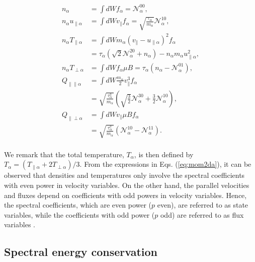 \documentclass[preprint,12pt]{elsarticle}
\begin{document}
\begin{subequations} \label{eq:mom2da}
\begin{align}
 n_\alpha  & = \int d W  f_\alpha  = \mathcal{N}_\alpha^{00}, \\
n_\alpha u_{\parallel \alpha } &  =  \int d W v_{\| } f_\alpha  =  \sqrt{ \frac{ \tau_{\alpha} }{m_\alpha } }   \mathcal{N}_\alpha^{10}, \label{eq:upara} \\
n_\alpha  T_{\parallel \alpha} & =   \int d W   m_\alpha \left(  v_{\|}-u_{\parallel \alpha}  \right)^2 f_\alpha \nonumber \\
& =   \tau_\alpha  \left(  \sqrt{2} \mathcal{N}_\alpha^{20} +  n_\alpha \right)  -  n_\alpha  m_\alpha  u_{\parallel \alpha } ^2,   \\
n_\alpha T_{\perp \alpha} & = \int d W f_\alpha \mu B  =  \tau_{\alpha}   \left(n_\alpha - \mathcal{N}_\alpha^{01} \right), \\
Q_{\parallel \parallel \alpha} & =    \int d W  \frac{m_\alpha}{2}  v_\parallel^3 f_\alpha  \nonumber \\
& =  \sqrt{\frac{ \tau_\alpha^3}{ m_\alpha} }   \left(\sqrt{\frac{3}{2}} \mathcal{N}_\alpha^{30}  + \frac{3}{2} \mathcal{N}_\alpha^{10} \right) , \\
Q_{\parallel \perp \alpha} & =  \int d W   v_\parallel \mu B  f_\alpha  \nonumber \nonumber \\
& =    \sqrt{\frac{ \tau_{\alpha}^3}{m_\alpha} } \left(  \mathcal{N}_\alpha^{10} - \mathcal{N}_\alpha^{11}\right).
\end{align}
\end{subequations}
\\
We remark that the total temperature, $T_\alpha$, is then defined by $ T_{\alpha} = ( T_{\parallel \alpha}  + 2 T_{\perp \alpha})/3 $. From the expressions in Eqs. (\ref{eq:mom2da}), it can be observed that densities and temperatures only involve the spectral coefficients with even power in velocity variables. On the other hand, the parallel velocities and fluxes depend on coefficients with odd powers in velocity variables. Hence, the spectral coefficients, which are even power ($p$ even), are referred to as state variables, while the coefficients with odd power ($p$ odd) are referred to as flux variables \cite{scott2021}.

\subsection{Spectral energy conservation}
\label{subsec:energyconservation}
\end{document}
